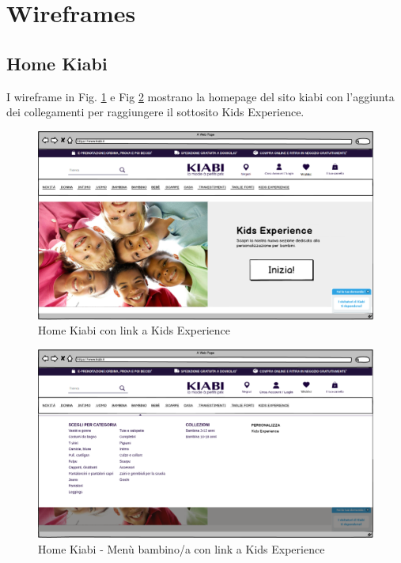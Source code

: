 \documentclass[12pt,italian,]{report}
\begin{document}
\section{Wireframes}\label{Wireframes}

\subsection{Home Kiabi}

I wireframe in Fig. \ref{kiabi_home} e Fig \ref{kiabi_home_selection} mostrano la homepage del sito kiabi con l'aggiunta dei collegamenti per raggiungere il sottosito Kids Experience.

\begin{figure}[h]
\centering
\includegraphics{../../balsamiq/balsamiq_finale/KiabiHome.png}
\caption{Home Kiabi con link a Kids Experience}
\label{kiabi_home}
\end{figure}

\begin{figure}[h]
\centering
\includegraphics{../../balsamiq/balsamiq_finale/KiabiScelta.png}
\caption{Home Kiabi - Menù bambino/a con link a Kids Experience}
\label{kiabi_home_selection}
\end{figure}
\end{document}
